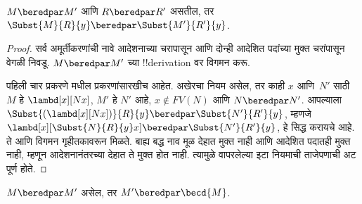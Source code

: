 \documentclass[../../../include/open-logic-section]{subfiles}
\begin{document}
\begin{lem}
  $M \beredpar M'$ आणि $R \beredpar R'$ असतील, तर $\Subst{M}{R}{y}
  \beredpar \Subst{M'}{R'}{y}$.
\end{lem}

\begin{proof}
  सर्व अमूर्तीकरणांची नावे आदेशनाच्या चरापासून आणि
  दोन्ही आदेशित पदांच्या मुक्त चरांपासून वेगळी निवडू.
  $M \beredpar M'$ च्या !!{derivation} वर विगमन करू.

  पहिली चार प्रकरणे  मधील
  प्रकरणांसारखीच आहेत. अखेरचा नियम
   असेल, तर काही $x$ आणि~$N'$
  साठी $M$ हे $\lambd[x][Nx]$, $M'$ हे $N'$
  आहे, $x \notin FV(N)$ आणि $N \beredpar N'$.
  आपल्याला $\Subst{(\lambd[x][Nx])}{R}{y} \beredpar
  \Subst{N'}{R'}{y}$, म्हणजे
  $\lambd[x][\Subst{N}{R}{y} x] \beredpar \Subst{N'}{R'}{y}$,
  हे सिद्ध करायचे आहे. ते 
  आणि विगमन गृहीतकावरून मिळते. बाह्य बद्ध नाव मूळ
  देहात मुक्त नाही आणि आदेशित पदातही मुक्त नाही, म्हणून
  आदेशनानंतरच्या देहात ते मुक्त होत नाही. त्यामुळे वापरलेल्या
  इटा नियमाची ताजेपणाची अट पूर्ण होते.
\end{proof}

\begin{lem}
  $M \beredpar M'$ असेल, तर $M' \beredpar \becd{M}$.
\end{lem}
\end{document}
